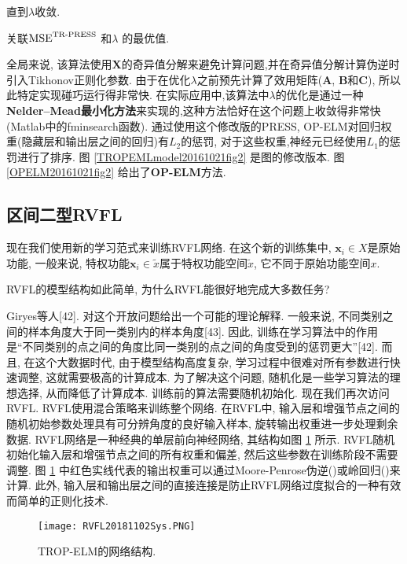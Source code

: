 直到$\lambda$收敛.

关联$\textup{MSE}^{\textup{TR-PRESS}}$ 和$\lambda$ 的最优值.

全局来说, 该算法使用$\bm X$的奇异值分解来避免计算问题,并在奇异值分解计算伪逆时引入Tikhonov正则化参数.
由于在优化$\lambda$之前预先计算了效用矩阵($\bm A$, $\bm B$和$\bm C$), 所以此特定实现碰巧运行得非常快.
在实际应用中,该算法中$\lambda$的优化是通过一种\textbf{Nelder–Mead最小化方法}来实现的,这种方法恰好在这个问题上收敛得非常快(Matlab中的fminsearch函数).
通过使用这个修改版的PRESS, OP-ELM对回归权重(隐藏层和输出层之间的回归)有$L_2$的惩罚, 对于这些权重,神经元已经使用$L_1$的惩罚进行了排序.
图 \ref{TROPEMLmodel20161021fig2} 是图的修改版本. 图 \ref{OPELM20161021fig2} 给出了\textbf{OP-ELM}方法.
\subsection{区间二型RVFL}
现在我们使用新的学习范式来训练RVFL网络.
在这个新的训练集中, $\bm x_i\in X$是原始功能, 一般来说, 特权功能$\bm x_i\in \widetilde x$属于特权功能空间$\widetilde x$, 它不同于原始功能空间$x$.

RVFL的模型结构如此简单, 为什么RVFL能很好地完成大多数任务?

Giryes等人[42]. 对这个开放问题给出一个可能的理论解释.
一般来说, 不同类别之间的样本角度大于同一类别内的样本角度[43]. 因此, 训练在学习算法中的作用是“不同类别的点之间的角度比同一类别的点之间的角度受到的惩罚更大”[42].
而且, 在这个大数据时代, 由于模型结构高度复杂, 学习过程中很难对所有参数进行快速调整, 这就需要极高的计算成本.
为了解决这个问题, 随机化是一些学习算法的理想选择, 从而降低了计算成本. 训练前的算法需要随机初始化.
现在我们再次访问RVFL. RVFL使用混合策略来训练整个网络. 在RVFL中, 输入层和增强节点之间的随机初始参数处理具有可分辨角度的良好输入样本, 旋转输出权重进一步处理剩余数据.
RVFL网络是一种经典的单层前向神经网络, 其结构如图 \ref{RVFLNN181102Sys} 所示. RVFL随机初始化输入层和增强节点之间的所有权重和偏差, 然后这些参数在训练阶段不需要调整.
图 \ref{RVFLNN181102Sys} 中红色实线代表的输出权重可以通过Moore-Penrose伪逆(\cite{paopillips1995-6471,IgelnikPao1995-6470})或岭回归(\cite{Bishop2012-6469})来计算.
此外, 输入层和输出层之间的直接连接是防止RVFL网络过度拟合的一种有效而简单的正则化技术.
\begin{figure}[tb]
\centering
  \texttt{[image: RVFL20181102Sys.PNG]}
  \caption{TROP-ELM的网络结构.}
  \label{RVFLNN181102Sys}
\end{figure}

